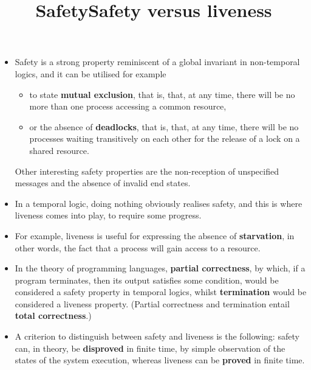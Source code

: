 \documentclass[wide]{slides}
\begin{document}
\begin{slide}
  \title{Safety}

  \begin{itemize}

    \item Safety is a strong property reminiscent of a global
      invariant in non\hyp{}temporal logics, and it can be utilised
      for example
      \begin{itemize}

        \item to state \textbf{mutual exclusion}, that is, that, at
          any time, there will be no more than one process accessing a
          common resource,

        \item or the absence of \textbf{deadlocks}, that is, that, at
          any time, there will be no processes waiting transitively on
          each other for the release of a lock on a shared
          resource.

      \end{itemize}
      Other interesting safety properties are the non\hyp{}reception
      of unspecified messages and the absence of invalid end states.

  \end{itemize}

\end{slide}

\begin{slide}
  \title{Safety versus liveness}

  \begin{itemize}

    \item In a temporal logic, doing nothing obviously realises
      safety, and this is where liveness comes into play, to require
      some progress.

    \item For example, liveness is useful for expressing the absence
      of \textbf{starvation}, in other words, the fact that a process
      will gain access to a resource.

    \item In the theory of programming languages, \textbf{partial
      correctness}, by which, if a program terminates, then its output
      satisfies some condition, would be considered a safety property
      in temporal logics, whilst \textbf{termination} would be
      considered a liveness property. (Partial correctness and
      termination entail \textbf{total correctness}.)

    \item A criterion to distinguish between safety and liveness is
      the following: safety can, in theory, be \textbf{disproved} in
      finite time, by simple observation of the states of the system
      execution, whereas liveness can be \textbf{proved} in finite
      time.

  \end{itemize}

\end{slide}
\end{document}
